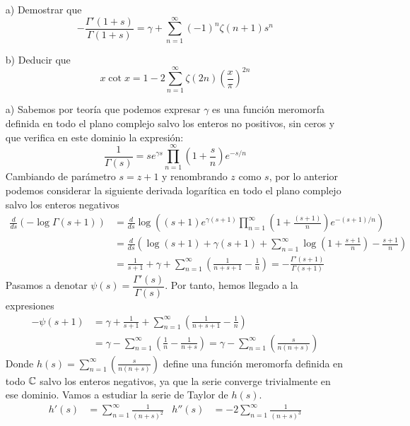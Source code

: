 \documentclass[twoside]{article}
\begin{document}
\begin{ejercicio}{4}
\begin{itemize}
\item[]
\item[a)] Demostrar que
$$
-\frac{\Gamma'(1+s)}{\Gamma(1+s)} = \gamma + \sum_{n=1}^\infty (-1)^n\zeta(n+1)s^n
$$
\item[b)] Deducir que
$$
x\cot x = 1 - 2\sum_{n=1}^\infty\zeta(2n)\left(\frac{x}{\pi}\right)^{2n}
$$
\end{itemize}
\end{ejercicio}
\begin{sol}
\begin{itemize}
\item[]
\item[a)] Sabemos por teoría que podemos expresar $\gamma$ es una función meromorfa definida en todo el plano complejo salvo los enteros no positivos, sin ceros y que verifica en este dominio la expresión:
\[ \frac{1}{Γ(s)} = s e^{γs} \prod_{n=1}^{∞} \left(1 + \frac{s}{n}\right) e^{-s/n} \]
Cambiando de parámetro $s=z+1$ y renombrando $z$ como $s$, por lo anterior podemos considerar la siguiente derivada logarítica en todo el plano complejo salvo los enteros negativos
\begin{align*}
\frac{d}{ds}\left(-\log \Gamma(s+1)\right) &=  \frac{d}{ds}\log\left((s+1) e^{γ(s+1)} \prod_{n=1}^{∞} \left(1 + \frac{(s+1)}{n}\right) e^{-(s+1)/n}\right)\\
&= \frac{d}{ds}\left( \log(s+1)+\gamma(s+1)+\sum_{n=1}^\infty \log\left(1+\frac{s+1}{n}\right)-\frac{s+1}{n}\right)\\
&= \frac{1}{s+1} +\gamma + \sum_{n=1}^\infty \left(\frac{1}{n+s+1}-\frac{1}{n}\right)= -\frac{\Gamma'(s+1)}{\Gamma(s+1)}
\end{align*}
Pasamos a denotar $\psi(s) = \dfrac{\Gamma'(s)}{\Gamma(s)}$. Por tanto, hemos llegado a la expresiones
\begin{align*}
-\psi(s+1) &= \gamma+\frac{1}{s+1} + \sum_{n=1}^\infty \left(\frac{1}{n+s+1}-\frac{1}{n}\right)\\
& = \gamma -\sum_{n=1}^\infty \left(\frac{1}{n} - \frac{1}{n+s}\right) = \gamma -\sum_{n=1}^\infty \left(\frac{s}{n(n+s)}\right) 
\end{align*}
Donde $h(s)=\sum_{n=1}^\infty \left(\frac{s}{n(n+s)}\right)$ define una función meromorfa definida en todo $\mathbb{C}$ salvo los enteros negativos, ya que la serie converge trivialmente en ese dominio. Vamos a estudiar la serie de Taylor de $h(s)$.
\begin{align*}
h'(s) & = \sum_{n=1}^\infty\frac{1}{(n+s)^2} & h''(s)&=  -2\sum_{n=1}^\infty\frac{1}{(n+s)^3}\\

\end{align*}
\end{itemize}
\end{sol}
\end{document}
